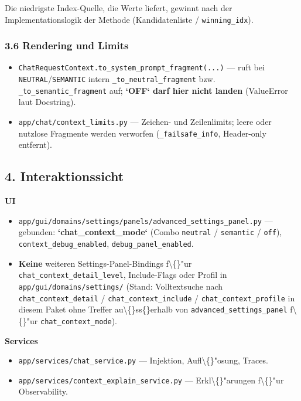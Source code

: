 Die niedrigste Index-Quelle, die Werte liefert, gewinnt nach der Implementationslogik der Methode (Kandidatenliste / \texttt{winning\_idx}).

\subsubsection{3.6 Rendering und Limits}

\begin{itemize}
\item \texttt{ChatRequestContext.to\_system\_prompt\_fragment(...)} --- ruft bei \texttt{NEUTRAL}/\texttt{SEMANTIC} intern \texttt{\_to\_neutral\_fragment} bzw. \texttt{\_to\_semantic\_fragment} auf; \textbf{`OFF` darf hier nicht landen} (ValueError laut Docstring).
\item \texttt{app/chat/context\_limits.py} --- Zeichen- und Zeilenlimits; leere oder nutzlose Fragmente werden verworfen (\texttt{\_failsafe\_info}, Header-only entfernt).
\end{itemize}

\subsection{4. Interaktionssicht}

\textbf{UI}

\begin{itemize}
\item \texttt{app/gui/domains/settings/panels/advanced\_settings\_panel.py} --- gebunden: \textbf{`chat\_context\_mode`} (Combo \texttt{neutral} / \texttt{semantic} / \texttt{off}), \texttt{context\_debug\_enabled}, \texttt{debug\_panel\_enabled}.
\item \textbf{Keine} weiteren Settings-Panel-Bindings f\textbackslash\{\}"ur \texttt{chat\_context\_detail\_level}, Include-Flags oder Profil in \texttt{app/gui/domains/settings/} (Stand: Volltextsuche nach \texttt{chat\_context\_detail} / \texttt{chat\_context\_include} / \texttt{chat\_context\_profile} in diesem Paket ohne Treffer au\textbackslash\{\}ss\{\}erhalb von \texttt{advanced\_settings\_panel} f\textbackslash\{\}"ur \texttt{chat\_context\_mode}).
\end{itemize}

\textbf{Services}

\begin{itemize}
\item \texttt{app/services/chat\_service.py} --- Injektion, Aufl\textbackslash\{\}"osung, Traces.
\item \texttt{app/services/context\_explain\_service.py} --- Erkl\textbackslash\{\}"arungen f\textbackslash\{\}"ur Observability.
\end{itemize}

